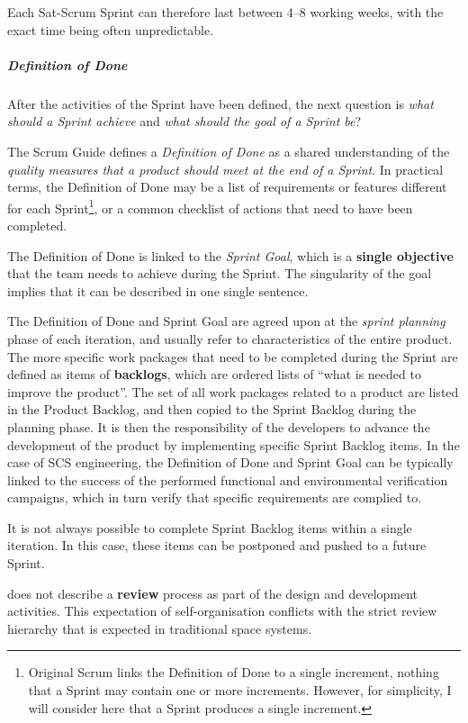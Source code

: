 \documentclass[a4paper,nobib,justified,final]{tufte-book}
\begin{document}
Each Sat-Scrum Sprint can therefore last between \qtyrange{4}{8}{} working weeks, with the exact time being often unpredictable.

\subparagraph{Definition of Done}

After the activities of the Sprint have been defined, the next question is \emph{what should a Sprint achieve} and \emph{what should the goal of a Sprint be}?

The Scrum Guide \cite{schwaverDefinitiveGuideScrum2020} defines a \emph{Definition of Done} as a shared understanding of the \emph{quality measures that a product should meet at the end of a Sprint}. In practical terms, the Definition of Done may be a list of requirements or features different for each Sprint\footnote{Original Scrum links the Definition of Done to a single increment, nothing that a Sprint may contain one or more increments. However, for simplicity, I will consider here that a Sprint produces a single increment.}, or a common checklist of actions that need to have been completed.

The Definition of Done is linked to the \emph{Sprint Goal}, which is a \textbf{single objective} that the team needs to achieve during the Sprint. The singularity of the goal implies that it can be described in one single sentence. 

The Definition of Done and Sprint Goal are agreed upon at the \emph{sprint planning} phase of each iteration, and usually refer to characteristics of the entire product. The more specific work packages that need to be completed during the Sprint are defined as items of \textbf{backlogs}, which are ordered lists of ``what is needed to improve the product''. The set of all work packages related to a product are listed in the Product Backlog, and then copied to the Sprint Backlog during the planning phase. It is then the responsibility of the developers to advance the development of the product by implementing specific Sprint Backlog items. In the case of \acs{SCS} engineering, the Definition of Done and Sprint Goal can be typically linked to the success of the performed functional and environmental verification campaigns, which in turn verify that specific requirements are complied to.

It is not always possible to complete Sprint Backlog items within a single iteration. In this case, these items can be postponed and pushed to a future Sprint.

 does not describe a \textbf{review} process as part of the design and development activities. This expectation of self-organisation conflicts with the strict review hierarchy that is expected in traditional space systems.
\label{sec:METHODOLOGY_reviews_general}
\end{document}
